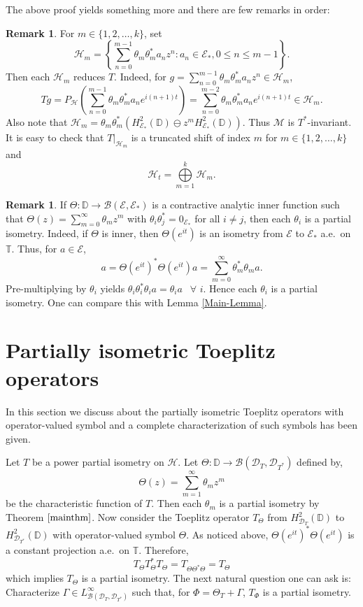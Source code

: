 \documentclass[12pt]{amsart}
\newcommand{\clb}{\mathcal{B}}
\newcommand{\cld}{\mathcal{D}}
\newcommand{\cle}{\mathcal{E}}
\newcommand{\clh}{\mathcal{H}}
\newcommand{\clm}{\mathcal{M}}
\newcommand{\D}{\mathbb{D}}
\newcommand{\T}{\mathbb{T}}
\newcommand{\E}{\mathcal{E}}
\theoremstyle{definition}
\theoremstyle{plain}
\theoremstyle{definition}
\newtheorem{rem}[thm]{Remark}
\numberwithin{equation}{section}
\begin{document}
The above proof yields something more and there are few remarks in order:

\begin{rem}
For $m\in \{1,2,\ldots,k\}$, set 
\[
\clh_m=\left\{\sum\limits_{n=0}^{m-1}\theta_m\theta_m^* a_nz^n: a_n \in \cle_*, 0 \leq n \leq m-1\right\}.
\]
Then each $\clh_m$ reduces $T$. Indeed, for $g= \sum\limits_{n=0}^{m-1}\theta_m\theta_m^* a_nz^n\in \clh_m$,
\[
Tg=P_\clh\left(\sum\limits_{n=0}^{m-1}\theta_m\theta_m^* a_ne^{i(n+1)t}\right)=\sum\limits_{n=0}^{m-2}\theta_m\theta_m^* a_ne^{i(n+1)t} \in \clh_m.
\]
Also note that $\clh_m=\theta_m\theta_m^*\left(H^2_{\cle_*}(\D)\ominus z^m H^2_{\cle_*}(\D)\right)$. Thus $\clm$ is $T^*$-invariant. It is easy to check that $T|_{\clh_m}$ is a truncated shift of index $m$ for $m \in\{1,2,\ldots,k\}$ and 
\[
\clh_t =\bigoplus\limits_{m=1}^k \clh_m.
\]
\end{rem}



\begin{rem}
If $\Theta: \D \rightarrow \clb(\cle,\cle_*)$ is a contractive analytic inner function such that $\Theta( z)=\sum\limits_{m=0}^\infty \theta_mz^m$ with 
$\theta_i\theta_j^*=0_{\cle_*}$ for all $i \neq j$, then each $\theta_i$ is a partial isometry. Indeed, if $\Theta$ is inner, then $\Theta(e^{it})$ is an isometry from $\E$ to $\E_*$ a.e.\ on $\T$.
Thus, for $a \in \E$, 
\[
a=\Theta(e^{it})^*\Theta(e^{it})a=\sum\limits_{m=0}^\infty \theta_m^*\theta_m a.
\]
Pre-multiplying by $\theta_i$ yields $\theta_i \theta_i^*\theta_i a=\theta_i a\,\, ~~ \forall\,\, i$. Hence each $\theta_i$ is a partial isometry. One can compare this with Lemma \ref{Main-Lemma}.
\end{rem}










\section{Partially isometric Toeplitz operators}{\label{sec4}}

In this section we discuss about the partially isometric Toeplitz operators with operator-valued symbol and a complete characterization of such symbols has been given.


Let $T$ be a power partial isometry on $\clh$. Let $\Theta: \D\rightarrow \clb(\cld_T,\cld_{T^*})$ defined by,
\[
\Theta( z)=\sum\limits_{m=1}^\infty \theta_mz^m
\]
be the characteristic function of $T$. Then each $\theta_m$ is a partial isometry
by Theorem $\ref{mainthm}$. Now consider the Toeplitz operator $T_\Theta$ from $H^2_{\cld_T}(\D)$ to $H^2_{\cld_{T^*}}(\D)$ with operator-valued symbol $\Theta$. 
As noticed above, 
$\Theta(e^{it})^*\Theta(e^{it})$  is a  constant projection a.e.\ on $\T$. Therefore,
\[
T_\Theta T_\Theta^* T_\Theta=T_{\Theta \Theta^*\Theta}=T_\Theta
\]
which implies $T_\Theta$ is a partial isometry. The next natural question one can ask is:
{Characterize $\Gamma \in L^\infty_{\clb(\cld_T,\cld_{T^*})}$ such that, for
$\Phi =\Theta_T + \Gamma$, $T_\Phi$ is  a partial isometry.} 
\end{document}
